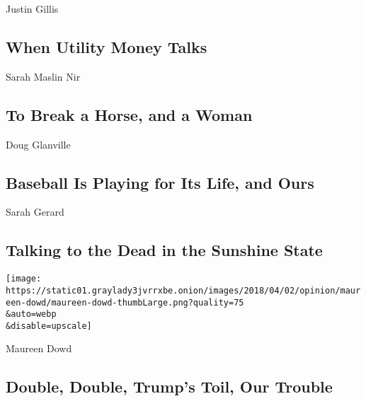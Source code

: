 Justin Gillis

\hypertarget{when-utility-money-talks}{%
\subsection{When Utility Money Talks}\label{when-utility-money-talks}}

\href{/2020/08/02/sunday-review/horse-crazy-nir-language.html}{}

Sarah Maslin Nir

\hypertarget{to-break-a-horse-and-a-woman}{%
\subsection{To Break a Horse, and a
Woman}\label{to-break-a-horse-and-a-woman}}

\href{/2020/08/02/opinion/baseball-coronavirus-Marlins.html}{}

Doug Glanville

\hypertarget{baseball-is-playing-for-its-life-and-ours}{%
\subsection{Baseball Is Playing for Its Life, and
Ours}\label{baseball-is-playing-for-its-life-and-ours}}

\href{/2020/08/01/opinion/spiritualism-cassadaga-florida.html}{}

Sarah Gerard

\hypertarget{talking-to-the-dead-in-the-sunshine-state}{%
\subsection{Talking to the Dead in the Sunshine
State}\label{talking-to-the-dead-in-the-sunshine-state}}

\href{/2020/08/01/opinion/sunday/trump-coronavirus-herman-cain.html}{}

\texttt{[image: https://static01.graylady3jvrrxbe.onion/images/2018/04/02/opinion/maureen-dowd/maureen-dowd-thumbLarge.png?quality=75\\\&auto=webp\\\&disable=upscale]}

Maureen Dowd

\hypertarget{double-double-trumps-toil-our-trouble}{%
\subsection{Double, Double, Trump's Toil, Our
Trouble}\label{double-double-trumps-toil-our-trouble}}

